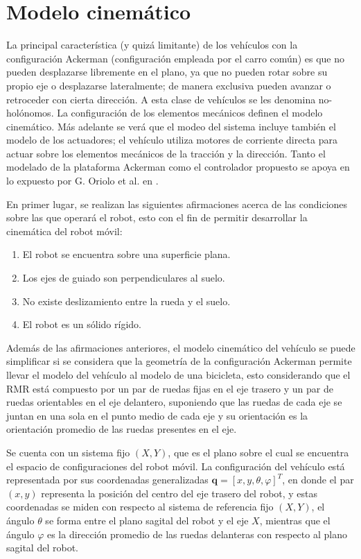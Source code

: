 \section{Modelo cinemático}
\label{sec:mc}
La principal característica (y quizá limitante) de los vehículos con la configuración Ackerman (configuración empleada por el carro común) es que no pueden desplazarse libremente en el plano, ya que no pueden rotar sobre su propio eje o desplazarse lateralmente; de manera exclusiva pueden avanzar o retroceder con cierta dirección. A esta clase de vehículos se les denomina no-holónomos. La configuración de los elementos mecánicos definen el modelo cinemático. Más adelante se verá que el modeo del sistema incluye también el modelo de los actuadores; el vehículo utiliza motores de corriente directa para actuar sobre los elementos mecánicos de la tracción y la dirección. Tanto el modelado de la plataforma Ackerman como el controlador propuesto se apoya en lo expuesto por G. Oriolo et al. en \cite{laumondRobotMotionPlanning1998}.
\par En primer lugar, se realizan las siguientes afirmaciones acerca de las condiciones sobre las que operará el robot, esto con el fin de permitir desarrollar la cinemática del robot móvil:
\begin{enumerate}
	\item El robot se encuentra sobre una superficie plana.
	\item Los ejes de guiado son perpendiculares al suelo.
	\item No existe deslizamiento entre la rueda y el suelo.
	\item El robot es un sólido rígido.
\end{enumerate}
\par Además de las afirmaciones anteriores, el modelo cinemático del vehículo se puede simplificar si se considera que la geometría de la configuración Ackerman permite llevar el modelo del vehículo al modelo de una bicicleta, esto considerando que el RMR está compuesto por un par de ruedas fijas en el eje trasero y un par de ruedas orientables en el eje delantero, suponiendo que las ruedas de cada eje se juntan en una sola en el punto medio de cada eje y su orientación es la orientación promedio de las ruedas presentes en el eje.
\par Se cuenta con un sistema fijo $(X, Y)$, que es el plano sobre el cual se encuentra el espacio de configuraciones del robot móvil. La configuración del vehículo está representada por sus coordenadas generalizadas $\mathbf{q}=[x, y, \theta, \varphi]^{T}$, en donde el par $(x, y)$ representa la posición del centro del eje trasero del robot, y estas coordenadas se miden con respecto al sistema de referencia fijo $(X, Y)$, el ángulo $\theta$ se forma entre el plano sagital del robot y el eje $X$, mientras que el ángulo $\varphi$ es la dirección promedio de las ruedas delanteras con respecto al plano sagital del robot. 
